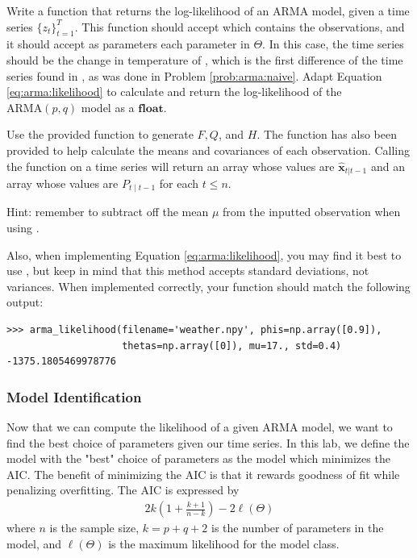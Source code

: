 \begin{problem}
\label{prob:arma:likelihood}
Write a function  that returns the log-likelihood of an ARMA model, given a time series $\{z_t\}_{t=1}^T$.
This function should accept  which contains the observations, and it should accept as parameters each parameter in $\Theta$. 
In this case, the time series should be the change in temperature of , which is the first difference of the time series found in , as was done in Problem \ref{prob:arma:naive}.
Adapt Equation \ref{eq:arma:likelihood} to calculate and return the log-likelihood of the $\text{ARMA}(p,q)$ model as a $\mathbf{float}$.

Use the provided  function to generate $F,Q$, and $H$.
The function  has also been provided to help calculate the means and covariances of each observation.
Calling the function  on a time series will return an array whose values are $\hat{\textbf{x}}_{t|t-1}$ and an array whose values are $P_{t\mid t-1}$ for each $t\leq n$.

\noindent Hint: remember to subtract off the mean $\mu$ from the inputted observation when using .

Also, when implementing Equation \ref{eq:arma:likelihood}, you may find it best to use , but keep in mind that this method accepts standard deviations, not variances.
When implemented correctly, your function should match the following output:
\begin{lstlisting}
>>> arma_likelihood(filename='weather.npy', phis=np.array([0.9]), 
                    thetas=np.array([0]), mu=17., std=0.4)
-1375.1805469978776
\end{lstlisting}
\end{problem}

\subsubsection*{Model Identification}

Now that we can compute the likelihood of a given ARMA model, we want to find the best choice of parameters given our time series.
In this lab, we define the model with the "best" choice of parameters as the model which minimizes the AIC.
The benefit of minimizing the AIC is that it rewards goodness of fit while penalizing overfitting.
The AIC is expressed by
\begin{align}
\label{eq:AIC:formula}
    2k\left(1 + \frac{k+1}{n-k}\right) - 2 \ell(\Theta)
\end{align}
where $n$ is the sample size, $k = p + q + 2$ is the number of parameters in
the model, and $\ell(\Theta)$ is the maximum likelihood for the model class.

